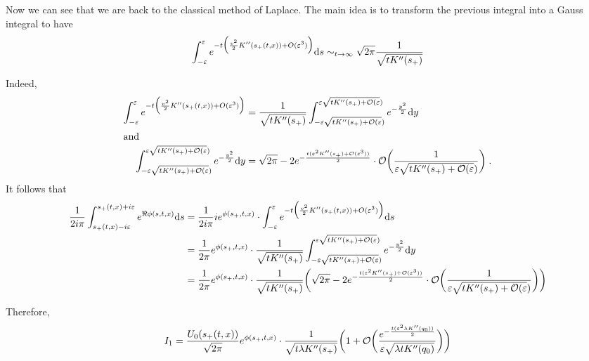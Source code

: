 \documentclass[11pt]{amsart}
\begin{document}
Now we can see that we are back to the classical method of Laplace. The main idea is to transform the previous integral into a Gauss integral to have
    \begin{equation}
    \int_{- \varepsilon}^{\varepsilon} e^{- t \Big(\frac{v^2}{2} K''(s_+(t,x)) + O(\varepsilon^3)\Big)} \mathrm ds 
    \sim_{t \to \infty}
    \sqrt{2\pi} \frac{1}{\sqrt{tK''(s_+)}}
    \end{equation}
    
Indeed, 
\begin{align*}
    \int_{- \varepsilon}^{\varepsilon} e^{- t \Big(\frac{v^2}{2} K''(s_+(t,x)) + O(\varepsilon^3)\Big)} 
    &= 
     \frac{1}{\sqrt{tK''(s_+)}} \int_{- \varepsilon \sqrt{tK''(s_+) + \mathcal{O}(\varepsilon})}^{\varepsilon \sqrt{tK''(s_+) + \mathcal{O}(\varepsilon})} e^{- \frac{y^2}{2}}\mathrm dy \\
     \intertext{and}
     \int_{- \varepsilon \sqrt{tK''(s_+) + \mathcal{O}(\varepsilon})}^{\varepsilon \sqrt{tK''(s_+) + \mathcal{O}(\varepsilon})} e^{- \frac{y^2}{2}}\mathrm dy &= 
    \sqrt{2\pi} - 2 e^{-\frac{t(\varepsilon^2 K''(s_+) + \mathcal{O}(\varepsilon^3))}{2}} \cdot \mathcal{O}\bigg(\frac{1 }{\varepsilon \sqrt{tK''(s_+) + \mathcal{O}(\varepsilon})}\bigg)
    \; .
\end{align*}
It follows that 
    \begin{align*}
     \frac{1}{2i\pi}   \int_{s_+(t,x) - i\varepsilon}^{s_+(t,x) + i\varepsilon} e^{\Re \phi(s,t,x)} \mathrm ds 
     &= 
     \frac{1}{2i\pi} i e^{\phi(s_+, t, x)} \cdot \int_{- \varepsilon}^{\varepsilon} e^{- t \Big(\frac{v^2}{2} K''(s_+(t,x)) + O(\varepsilon^3)\Big)} \mathrm ds  \\
     &= 
      \frac{1}{2\pi} e^{\phi(s_+, t, x)} \cdot \frac{1}{\sqrt{tK''(s_+)}} \int_{- \varepsilon \sqrt{tK''(s_+) + \mathcal{O}(\varepsilon})}^{\varepsilon \sqrt{tK''(s_+) + \mathcal{O}(\varepsilon})} e^{- \frac{y^2}{2}}\mathrm dy \\
     &=
    \frac{1}{2\pi} e^{\phi(s_+, t, x)} \cdot \frac{1}{\sqrt{tK''(s_+)}} \bigg( 
    \sqrt{2\pi} - 2 e^{-\frac{t(\varepsilon^2 K''(s_+) + \mathcal{O}(\varepsilon^3))}{2}} \cdot \mathcal{O}\bigg(\frac{1 }{\varepsilon \sqrt{tK''(s_+) + \mathcal{O}(\varepsilon})}\bigg) \bigg) \\
    \end{align*}
    
Therefore, 
    \begin{equation}
    I_1 = \frac{U_0(s_+(t,x))}{\sqrt{2\pi}} e^{\phi(s_+, t, x)} \cdot \frac{1}{\sqrt{t \lambda K''(s_+)}} \bigg( 
    1 + \mathcal{O}\bigg(\frac{e^{-\frac{t(\varepsilon^2 \lambda K''(q_0))}{2}} }{\varepsilon \sqrt{\lambda tK''(q_0)}}\bigg) \bigg)\\
    \end{equation}
    
\end{document}
